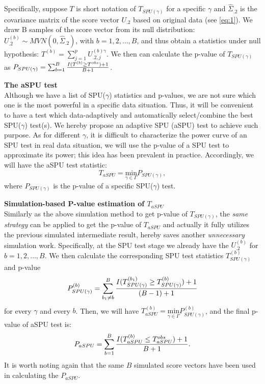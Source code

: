 \documentclass[compress]{beamer}
\begin{document}
\begin{frame}[allowframebreaks]
Specifically, suppose $T$ is short notation of $T_{ SPU(\gamma) }$ for a specific $\gamma$ and $\hat{\Sigma}_{.2}$ is the covariance matrix of the score vector $U_{.2}$ based on original data (see \ref{eq:1}). We draw B samples of the score vector from its null distribution: $U_{.2}^{ (b) } \sim MVN \left( 0, \hat{\Sigma}_{.2} \right)$, with $b = 1,2,\ldots,B$, and thus obtain a statistics under null hypothesis: $T ^ {(b)} = \sum_{j=1}^p U^{ (b)\gamma }_{.2, j} $. We then can calculate the p-value of $T_{ SPU(\gamma) }$ as $P_{ SPU(\gamma) } = \sum_{b=1}^B { I(T^{(b)} \geq T ^ {obs} ) + 1  \over B + 1 } $. 


\framebreak
\textbf{The aSPU test}\\
Although we have a list of SPU($\gamma$) statistics and p-values, we are not sure which one is the most powerful in a specific data situation. Thus, it will be convenient to have a test which data-adaptively and automatically select/combine the best SPU($\gamma$) test(s). We hereby propose an adaptive SPU (aSPU) test to achieve such purpose. As for different $\gamma$, it is difficult to characterize the power curve of an SPU test in real data situation, we will use the p-value of a SPU test to approximate its power; this idea has been prevalent in practice. Accordingly, we will have the aSPU test statistic:
$$
T_{aSPU} = \underset{\gamma\in\Gamma}{ \textrm{min} } P_{ SPU(\gamma) },
$$
where $P_{ SPU(\gamma) }$ is the p-value of a specific SPU($\gamma$) test.

\framebreak
\textbf{Simulation-based P-value estimation of $T_{aSPU}$ }\\
Similarly as the above simulation method to get p-value of $T_{ SPU(\gamma) }$, the \textit{same strategy} can be applied to get the p-value of $T_{aSPU}$ and actually it fully utilizes the previous simulated intermediate result, hereby saves another \textit{unnecessary} simulation work. Specifically, at the SPU test stage we already have the $U_{.2}^{ (b) }$ for $b = 1,2,\ldots,B$. We then calculate the corresponding SPU test statistics $T^{ (b) }_{ SPU(\gamma) }$ and p-value 
$$
P^{ (b) }_{ SPU(\gamma) } =  \sum_{b_1 \neq b}^B { I(T^{ (b_1) }_{ SPU(\gamma) } \geq T^{ (b) }_{ SPU(\gamma) } ) + 1  \over (B-1) + 1 } 
$$
for every $\gamma$ and every $b$. Then, we will have $ 
T ^ {(b)} _{aSPU} = \underset{\gamma\in\Gamma}{ \textrm{min} } P^{ (b) }_{ SPU(\gamma) }
$, and the final p-value of aSPU test is:
$$
P_{aSPU} = \sum_{b=1}^B { I(T ^ {(b)} _{aSPU} \leq T ^ {obs} _{aSPU} ) + 1  \over B + 1 }.
$$
It is worth noting again that the same $B$ simulated score vectors have been used in calculating the $P_{aSPU}$. 


\end{frame}
\end{document}
